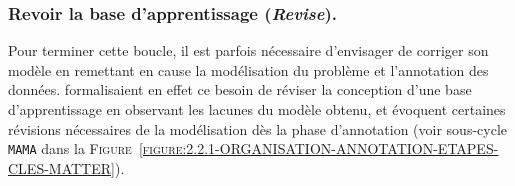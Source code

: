 		\subsubsection{Revoir la base d'apprentissage (\textit{\textbf{R}evise}).}
		\label{section:2.2.1.C-ORGANISATION-ANNOTATION-ETAPES-CLES-REVISE}
		
			Pour terminer cette boucle, il est parfois nécessaire d'envisager de corriger son modèle en remettant en cause la modélisation du problème et l'annotation des données.
			\cite{voormann-gut:2008:agile-corpus-creationa} formalisaient en effet ce besoin de réviser la conception d'une base d'apprentissage en observant les lacunes du modèle obtenu, et \cite{pustejovsky-stubbs:2012:natural-language-annotation} évoquent certaines révisions nécessaires de la modélisation dès la phase d'annotation (voir sous-cycle \texttt{MAMA} dans la \textsc{Figure~\ref{figure:2.2.1-ORGANISATION-ANNOTATION-ETAPES-CLES-MATTER}}).
			
